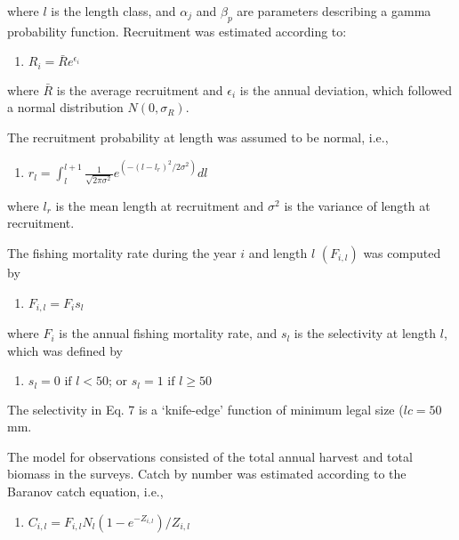 \documentclass[12pt]{article}
\providecommand{\tightlist}{%
  \setlength{\itemsep}{0pt}\setlength{\parskip}{0pt}}
\begin{document}
where \(l\) is the length class, and \(\alpha_j\) and \(\beta_p\) are
parameters describing a gamma probability function. Recruitment was
estimated according to:

\begin{enumerate}
\def\labelenumi{\arabic{enumi})}
\setcounter{enumi}{3}
\tightlist
\item
  \(R_i = \bar{R}e^{\epsilon_i}\)
\end{enumerate}

where \(\bar{R}\) is the average recruitment and \(\epsilon_i\) is the
annual deviation, which followed a normal distribution
\(N(0,\sigma_R)\).

The recruitment probability at length was assumed to be normal, i.e.,

\begin{enumerate}
\def\labelenumi{\arabic{enumi})}
\setcounter{enumi}{4}
\tightlist
\item
  \(r_l=\int_l^{l+1}\frac{1}{\sqrt{2\pi\sigma^2}} e^{(-(l-l_r)^2/2\sigma^2)}dl\)
\end{enumerate}

where \(l_r\) is the mean length at recruitment and \(\sigma^2\) is the
variance of length at recruitment.

The fishing mortality rate during the year \(i\) and length \(l\)
\((F_{i,l})\) was computed by

\begin{enumerate}
\def\labelenumi{\arabic{enumi})}
\setcounter{enumi}{5}
\tightlist
\item
  \(F_{i,l} = F_i s_l\)
\end{enumerate}

where \(F_i\) is the annual fishing mortality rate, and \(s_l\) is the
selectivity at length \(l\), which was defined by

\begin{enumerate}
\def\labelenumi{\arabic{enumi})}
\setcounter{enumi}{6}
\tightlist
\item
  \(s_l =0 \text{   if   } l < 50 \text{;  or   } s_l = 1 \text{     if      } l \geqslant 50\)
\end{enumerate}

The selectivity in Eq. 7 is a `knife-edge' function of minimum legal
size (\(lc=50\) mm.

The model for observations consisted of the total annual harvest and
total biomass in the surveys. Catch by number was estimated according to
the Baranov catch equation, i.e.,

\begin{enumerate}
\def\labelenumi{\arabic{enumi})}
\setcounter{enumi}{7}
\tightlist
\item
  \(C_{i,l}=F_{i,l} N_l (1-e^{-Z_{i,l}})/Z_{i,l}\)
\end{enumerate}
\end{document}
